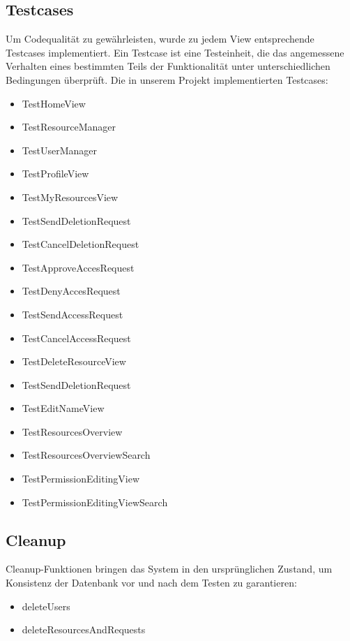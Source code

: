\documentclass[parskip=full,11pt]{scrartcl}
\begin{document}
\subsection*{Testcases}
Um Codequalität zu gewährleisten, wurde zu jedem View entsprechende Testcases implementiert. Ein Testcase ist eine Testeinheit, die das angemessene Verhalten eines bestimmten Teils der Funktionalität unter unterschiedlichen Bedingungen überprüft. Die in unserem Projekt implementierten Testcases:  
\begin{itemize}
\item TestHomeView
\item TestResourceManager
\item TestUserManager
\item TestProfileView
\item TestMyResourcesView
\item TestSendDeletionRequest
\item TestCancelDeletionRequest
\item TestApproveAccesRequest
\item TestDenyAccesRequest
\item TestSendAccessRequest
\item TestCancelAccessRequest
\item TestDeleteResourceView
\item TestSendDeletionRequest
\item TestEditNameView
\item TestResourcesOverview
\item TestResourcesOverviewSearch
\item TestPermissionEditingView
\item TestPermissionEditingViewSearch

\end{itemize}
\subsection*{Cleanup}
Cleanup-Funktionen bringen das System in den ursprünglichen Zustand, um Konsistenz der Datenbank vor und nach dem Testen zu garantieren:  
\begin{itemize}
\item deleteUsers
\item deleteResourcesAndRequests
\end{itemize}

\newpage
\end{document}
